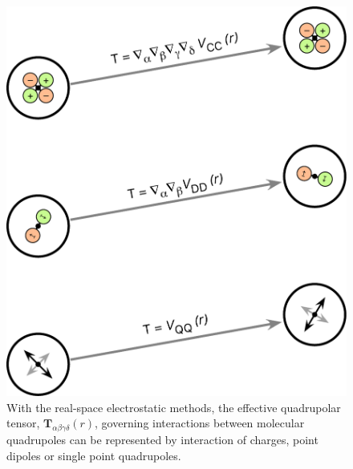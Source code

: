 \begin{figure}
  \centering
  \includegraphics[width=\linewidth]{QuadrupoleFigure}
\caption{With the real-space electrostatic methods, the effective
  quadrupolar tensor, $\mathbf{T}_{\alpha\beta\gamma\delta}(r)$, governing interactions between molecular quadrupoles can be represented by interaction of charges, point dipoles or single point quadrupoles.}
\label{fig:quadrupolarFluid}
\end{figure}

